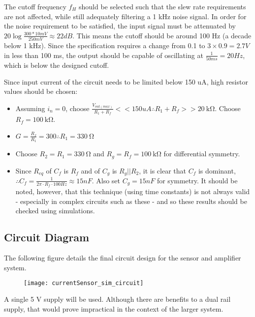 The cutoff frequency $f_H$ should be selected such that the slew rate requirements are not affected, while still adequately filtering a 1 kHz noise signal. In order for the noise requirement
to be satisfied, the input signal must be attenuated by $20 \log{\frac{300 * 10 mV}{250 mV}} \approx 22 dB$. This means the cutoff should be around 100 Hz (a decade below 1 kHz).
Since the specification requires a change from 0.1 to $3 \times 0.9 = 2.7 V$ in less than 100 ms, the output should be capable of oscillating at $\frac{1}{50 ms} = 20 Hz$, which is below the designed cutoff.

Since input current of the circuit needs to be limited below 150 uA, high resistor values should be chosen:
\begin{itemize}
  \item Assuming $i_n = 0$, choose $\frac{V_{out(max)}}{R_1 + R_f} << 150 uA \therefore R_1 + R_f >> \SI{20}{\kilo\ohm}$. Choose $R_f = \SI{100}{\kilo\ohm}$.
  \item $G = \frac{R_f}{R_1} = 300 \therefore R_1 = \SI{330}{\ohm}$
  \item Choose $R_2 = R_1 = \SI{330}{\ohm}$ and $R_g = R_f = \SI{100}{\kilo\ohm}$ for differential symmetry.
  \item Since $R_{eq}$ of $C_f$ is $R_f$ and of $C_g$ is $R_g || R_2$, it is clear that $C_f$ is dominant, $\therefore C_f = \frac{1}{2 \pi \cdot R_f \cdot 100 Hz} \approx 15 nF$. Also set $C_g = 15nF$ for symmetry.
        It should be noted, however, that this technique (using time constants) is not always valid - especially in complex circuits such as these - and so these results should be checked using simulations.
\end{itemize}

\subsection{Circuit Diagram}
The following figure details the final circuit design for the sensor and amplifier system.

\begin{figure}[h!]
  \centering
  \texttt{[image: currentSensor\_sim\_circuit]}
  \label{fig:circuit-diagram}
\end{figure}

A single 5 V supply will be used. Although there are benefits to a dual rail supply, that would prove impractical in the context of the larger system.

\pagebreak
